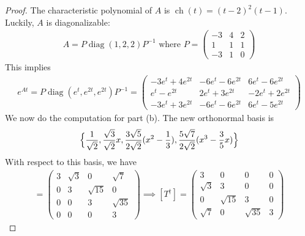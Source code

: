 \documentclass{report}
\begin{document}
\begin{proof}
The characteristic polynomial of $A$ is  $\operatorname{ch}(t)=(t-2)^2(t-1)$. Luckily, $A$ is diagonalizable: 
\begin{align*}
A= P\operatorname{diag}(1,2,2)P^{-1}\text{ where }P= \begin{pmatrix} 
-3 & 4 & 2 \\
1 & 1 & 1 \\
-3 & 1 & 0
\end{pmatrix}
\end{align*}
This implies 
\begin{align*}
  e^{At}= P \operatorname{diag}(e^t,e^{2t},e^{2t})P^{-1}= \begin{pmatrix} 
    -3e^t +4e^{2t} & -6 e^t -6e^{2t} & 6e^t - 6 e^{2t} \\
    e^{t}-e^{2t} & 2e^t + 3 e^{2t} & -2e^{t} +2e^{2t} \\
    -3e^t +3e^{2t} & -6 e^t -6 e^{2t} & 6e^t - 5 e^{2t}
  \end{pmatrix}
\end{align*}
We now do the computation for part (b). The new orthonormal basis is 
\begin{align*}
\Big\{ \frac{1}{\sqrt{2}}, \frac{\sqrt{3}}{\sqrt{2}}x,\frac{3\sqrt{5} }{2\sqrt{2} }(x^2 - \frac{1}{3}),\frac{5 \sqrt{7} }{2\sqrt{2} }(x^3- \frac{3}{5}x) \Big\}
\end{align*}
With respect to this basis, we have 
\begin{align*}
[T]= \begin{pmatrix} 
  3 & \sqrt{3} & 0 & \sqrt{7} \\
  0 & 3 & \sqrt{15} & 0 \\
  0 & 0 & 3 & \sqrt{35} \\
  0 & 0 & 0 & 3    
\end{pmatrix}  \implies [T^\dagger ]= \begin{pmatrix} 
  3 & 0 & 0 & 0 \\
  \sqrt{3} & 3 & 0 & 0 \\
  0 & \sqrt{15}  & 3 & 0 \\
  \sqrt{7}  & 0& \sqrt{35}  & 3
\end{pmatrix}
\end{align*}
\end{proof}
\end{document}
